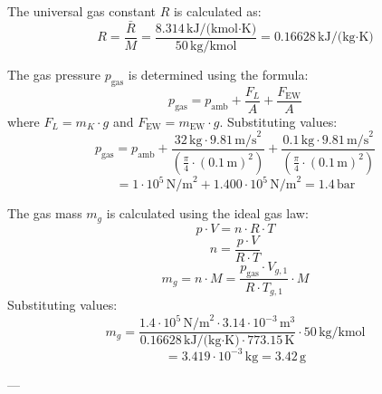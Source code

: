 The universal gas constant \( R \) is calculated as:  
\[
R = \frac{\bar{R}}{M} = \frac{8.314 \, \text{kJ/(kmol·K)}}{50 \, \text{kg/kmol}} = 0.16628 \, \text{kJ/(kg·K)}
\]

The gas pressure \( p_{\text{gas}} \) is determined using the formula:  
\[
p_{\text{gas}} = p_{\text{amb}} + \frac{F_L}{A} + \frac{F_{\text{EW}}}{A}
\]
where \( F_L = m_K \cdot g \) and \( F_{\text{EW}} = m_{\text{EW}} \cdot g \). Substituting values:  
\[
p_{\text{gas}} = p_{\text{amb}} + \frac{32 \, \text{kg} \cdot 9.81 \, \text{m/s}^2}{\left(\frac{\pi}{4} \cdot (0.1 \, \text{m})^2\right)} + \frac{0.1 \, \text{kg} \cdot 9.81 \, \text{m/s}^2}{\left(\frac{\pi}{4} \cdot (0.1 \, \text{m})^2\right)}
\]
\[
= 1 \cdot 10^5 \, \text{N/m}^2 + 1.400 \cdot 10^5 \, \text{N/m}^2 = 1.4 \, \text{bar}
\]

The gas mass \( m_g \) is calculated using the ideal gas law:  
\[
p \cdot V = n \cdot R \cdot T
\]
\[
n = \frac{p \cdot V}{R \cdot T}
\]
\[
m_g = n \cdot M = \frac{p_{\text{gas}} \cdot V_{g,1}}{R \cdot T_{g,1}} \cdot M
\]
Substituting values:  
\[
m_g = \frac{1.4 \cdot 10^5 \, \text{N/m}^2 \cdot 3.14 \cdot 10^{-3} \, \text{m}^3}{0.16628 \, \text{kJ/(kg·K)} \cdot 773.15 \, \text{K}} \cdot 50 \, \text{kg/kmol}
\]
\[
= 3.419 \cdot 10^{-3} \, \text{kg} = 3.42 \, \text{g}
\]

---